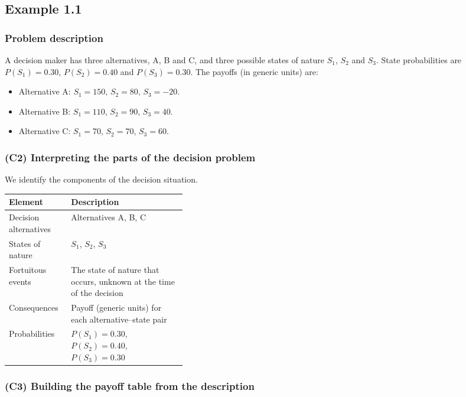 \subsection{Example 1.1}\label{sec:example1-1}

\subsubsection{Problem description}\label{subsec:example1-1-problem}

A decision maker has three alternatives, A, B and C, and three possible states of nature \(S_1\), \(S_2\) and \(S_3\).
State probabilities are \(P(S_1)=0.30\), \(P(S_2)=0.40\) and \(P(S_3)=0.30\).
The payoffs (in generic units) are:

\begin{itemize}
	\item Alternative A: \(S_1=150\), \(S_2=80\), \(S_3=-20\).
	\item Alternative B: \(S_1=110\), \(S_2=90\), \(S_3=40\).
	\item Alternative C: \(S_1=70\), \(S_2=70\), \(S_3=60\).
\end{itemize}


\subsubsection{(C2) Interpreting the parts of the decision problem}\label{subsubsec:example1-1-c2}

We identify the components of the decision situation.

\begin{center}
	\begin{tabularx}{\linewidth}{@{}L{0.35\linewidth}Y@{}}
		\toprule
		Element & Description \\
		\midrule
		Decision alternatives & Alternatives A, B, C \\
		States of nature & \(S_1\), \(S_2\), \(S_3\) \\
		Fortuitous events & The state of nature that occurs, unknown at the time of the decision \\
		Consequences & Payoff (generic units) for each alternative--state pair \\
		Probabilities & \(P(S_1)=0.30\), \(P(S_2)=0.40\), \(P(S_3)=0.30\) \\
		\bottomrule
	\end{tabularx}
\end{center}

\subsubsection{(C3) Building the payoff table from the description}\label{subsubsec:example1-1-c3}

